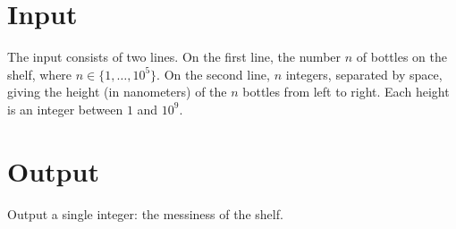 \section*{Input}

The input consists of two lines.
On the first line, the number $n$ of bottles on the shelf, where $n\in\{1,\ldots, 10^5\}$.
On the second line, $n$ integers, separated by space, giving the height (in nanometers) of the $n$ bottles from left to right.
Each height is an integer between $1$ and $10^9$.

\section*{Output}

Output a single integer: the messiness of the shelf.
